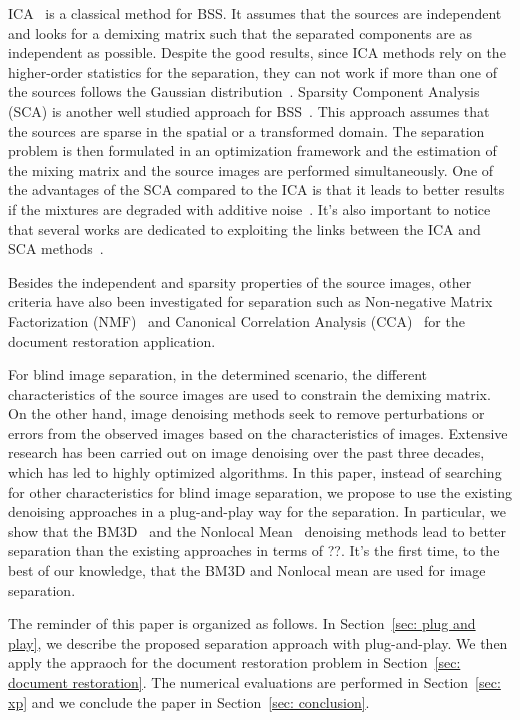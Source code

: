 \documentclass[conference]{IEEEtran}
\theoremstyle{plain}
\begin{document}
ICA~\cite{hyvarinen2004independent} is a classical method for BSS. It assumes that the sources are independent and looks for a demixing matrix such that the separated components are as independent as possible. Despite the good results, since ICA methods rely on the higher-order statistics for the separation, they can not work if more than one of the sources follows the Gaussian distribution~\cite{nordhausen2018independent}. Sparsity Component Analysis (SCA) is another well studied approach for BSS~\cite{souidene2007blind, zibulevsky2001blind,bobin2007sparsity}. This approach assumes that the sources are sparse in the spatial or a transformed domain. The separation problem is then formulated in an optimization framework and the estimation of the mixing matrix and the source images are performed simultaneously. One of the advantages of the SCA compared to the ICA is that it leads to better results if the mixtures are degraded with additive noise~\cite{bobin2007sparsity}. It's also important to notice that several works are dedicated to exploiting the links between the ICA and SCA methods~\cite{feng2018revisiting,bronstein2005sparse,boukouvalas2018sparsity}.

Besides the independent and sparsity properties of the source images, other criteria have also been investigated for separation such as Non-negative Matrix Factorization (NMF)~\cite{merrikh2010using} and Canonical Correlation Analysis (CCA)~\cite{boccuto2019blind} for the document restoration application. 

For blind image separation, in the determined scenario, the different characteristics of the source images are used to constrain the demixing matrix. On the other hand, image denoising methods seek to remove perturbations or errors from the observed images based on the characteristics of images. Extensive research has been carried out on image denoising over the past three decades, which has led to highly optimized algorithms. In this paper, instead of searching for other characteristics for blind image separation, we propose to use the existing denoising approaches in a plug-and-play way for the separation. In particular, we show that the BM3D~\cite{dabov2007image} and the Nonlocal Mean~\cite{buades2005non} denoising methods lead to better separation than the existing approaches in terms of ??. It's the first time, to the best of our knowledge, that the BM3D and Nonlocal mean are used for image separation.

The reminder of this paper is organized as follows. In Section~\ref{sec: plug and play}, we describe the proposed separation approach with plug-and-play. We then apply the appraoch for the document restoration problem in Section~\ref{sec: document restoration}. The numerical evaluations are performed in Section~\ref{sec: xp} and we conclude the paper in Section~\ref{sec: conclusion}.  
\end{document}
